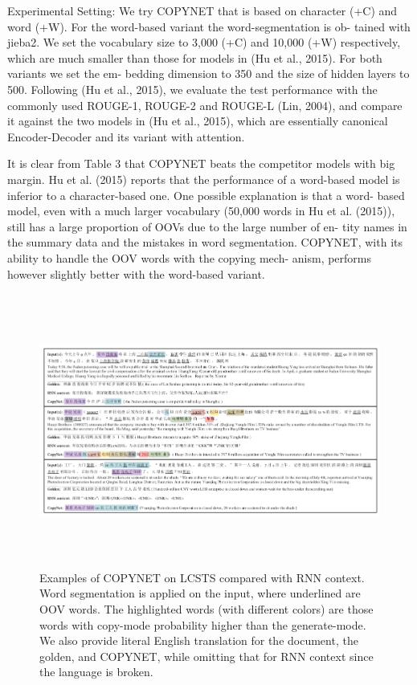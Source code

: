 \documentclass[UTF8]{ctexart}
\begin{document}
    Experimental Setting: We try COPYNET that is
based on character (+C) and word (+W). For the
word-based variant the word-segmentation is ob-
tained with jieba2. We set the vocabulary size to
3,000 (+C) and 10,000 (+W) respectively, which
are much smaller than those for models in (Hu
et al., 2015). For both variants we set the em-
bedding dimension to 350 and the size of hidden
layers to 500. Following (Hu et al., 2015), we
evaluate the test performance with the commonly
used ROUGE-1, ROUGE-2 and ROUGE-L (Lin,
2004), and compare it against the two models in
(Hu et al., 2015), which are essentially canonical
Encoder-Decoder and its variant with attention.

It is clear from Table 3 that COPYNET beats
the competitor models with big margin. Hu
et al. (2015) reports that the performance of a
word-based model is inferior to a character-based
one. One possible explanation is that a word-
based model, even with a much larger vocabulary
(50,000 words in Hu et al. (2015)), still has a large
proportion of OOVs due to the large number of en-
tity names in the summary data and the mistakes
in word segmentation. COPYNET, with its ability
to handle the OOV words with the copying mech-
anism, performs however slightly better with the
word-based variant.

\begin{figure}[htbp]
    \centering
    \vspace{-0.35cm} 
    \includegraphics[width=15cm,height=9cm]{pictures/TS.jpg}
    \caption{ Examples of COPYNET on LCSTS compared with RNN context. Word segmentation is
    applied on the input, where underlined are OOV words. The highlighted words (with different colors)
    are those words with copy-mode probability higher than the generate-mode. We also provide literal
    English translation for the document, the golden, and COPYNET, while omitting that for RNN context
    since the language is broken. }
\end{figure}
\end{document}
